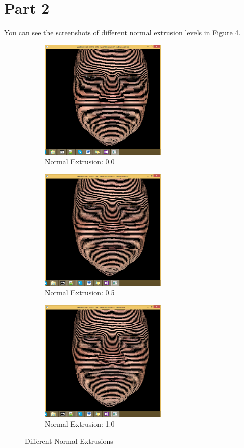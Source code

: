 \section{Part 2}

You can see the screenshots of different normal extrusion levels in Figure \ref{fig:3-2}.

\begin{figure}
        \centering
        \begin{subfigure}[b]{0.3\textwidth}
                \includegraphics[width=6cm]{../Screenshots/ex-3/2-1.png}
                \caption{Normal Extrusion: 0.0}
                \label{fig:3-2-1}
        \end{subfigure}

        \begin{subfigure}[b]{0.3\textwidth}
                \includegraphics[width=6cm]{../Screenshots/ex-3/2-2.png}
                \caption{Normal Extrusion: 0.5}
                \label{fig:3-2-2}
        \end{subfigure}

        \begin{subfigure}[b]{0.3\textwidth}
                \includegraphics[width=6cm]{../Screenshots/ex-3/2-3.png}
                \caption{Normal Extrusion: 1.0}
                \label{fig:3-2-3}
        \end{subfigure}
        \caption{Different Normal Extrusions}\label{fig:3-2}
\end{figure}



